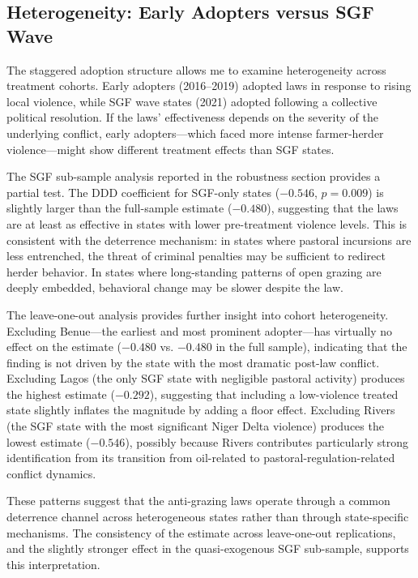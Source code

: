 \documentclass[12pt]{article}
\begin{document}
\subsection{Heterogeneity: Early Adopters versus SGF Wave}

The staggered adoption structure allows me to examine heterogeneity across treatment cohorts. Early adopters (2016--2019) adopted laws in response to rising local violence, while SGF wave states (2021) adopted following a collective political resolution. If the laws' effectiveness depends on the severity of the underlying conflict, early adopters---which faced more intense farmer-herder violence---might show different treatment effects than SGF states.

The SGF sub-sample analysis reported in the robustness section provides a partial test. The DDD coefficient for SGF-only states ($-0.546$, $p = 0.009$) is slightly larger than the full-sample estimate ($-0.480$), suggesting that the laws are at least as effective in states with lower pre-treatment violence levels. This is consistent with the deterrence mechanism: in states where pastoral incursions are less entrenched, the threat of criminal penalties may be sufficient to redirect herder behavior. In states where long-standing patterns of open grazing are deeply embedded, behavioral change may be slower despite the law.

The leave-one-out analysis provides further insight into cohort heterogeneity. Excluding Benue---the earliest and most prominent adopter---has virtually no effect on the estimate ($-0.480$ vs. $-0.480$ in the full sample), indicating that the finding is not driven by the state with the most dramatic post-law conflict. Excluding Lagos (the only SGF state with negligible pastoral activity) produces the highest estimate ($-0.292$), suggesting that including a low-violence treated state slightly inflates the magnitude by adding a floor effect. Excluding Rivers (the SGF state with the most significant Niger Delta violence) produces the lowest estimate ($-0.546$), possibly because Rivers contributes particularly strong identification from its transition from oil-related to pastoral-regulation-related conflict dynamics.

These patterns suggest that the anti-grazing laws operate through a common deterrence channel across heterogeneous states rather than through state-specific mechanisms. The consistency of the estimate across leave-one-out replications, and the slightly stronger effect in the quasi-exogenous SGF sub-sample, supports this interpretation.
\end{document}
